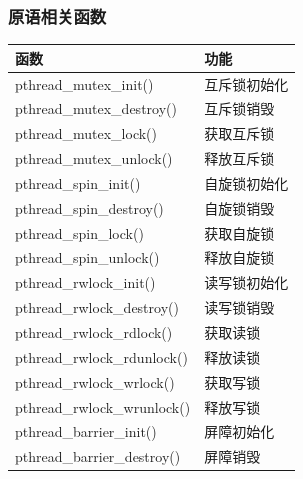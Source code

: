 \documentclass{article}
\begin{document}
\subsubsection{原语相关函数}
\begin{tabular}[H]{|l|l|}%
	\hline  %
	函数                        & 功能                                                  \\
	\hline
	pthread\_mutex\_init()      & 互斥锁初始化                                          \\
	\hline
	pthread\_mutex\_destroy()   & 互斥锁销毁                                            \\
	\hline
	pthread\_mutex\_lock()      & 获取互斥锁                                            \\
	\hline
	pthread\_mutex\_unlock()    & 释放互斥锁                                            \\
	\hline
	pthread\_spin\_init()       & 自旋锁初始化                                          \\
	\hline
	pthread\_spin\_destroy()    & 自旋锁销毁                                            \\
	\hline
	pthread\_spin\_lock()       & 获取自旋锁                                            \\
	\hline
	pthread\_spin\_unlock()     & 释放自旋锁                                            \\
	\hline
	pthread\_rwlock\_init()     & 读写锁初始化                                          \\
	\hline
	pthread\_rwlock\_destroy()  & 读写锁销毁                                            \\
	\hline
	pthread\_rwlock\_rdlock()   & 获取读锁                                              \\
	\hline
	pthread\_rwlock\_rdunlock() & 释放读锁                                              \\
	\hline
	pthread\_rwlock\_wrlock()   & 获取写锁                                              \\
	\hline
	pthread\_rwlock\_wrunlock() & 释放写锁                                              \\
	\hline
	pthread\_barrier\_init()    & 屏障初始化                                            \\
	\hline
	pthread\_barrier\_destroy() & 屏障销毁                                              \\

\end{tabular}
\end{document}
